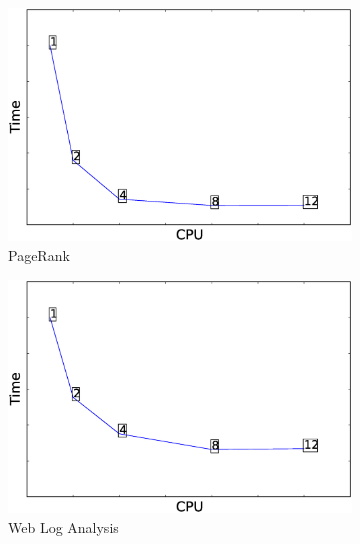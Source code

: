 \begin{figure}
    \captionsetup{justification=centering}
    \centering
    \begin{subfigure}[b]{0.3\textwidth}
        \includegraphics[width=\textwidth]{Chapter-CAT/figures/pagerank_cpu_elapsed_12_1.eps}
        \caption{PageRank}
        \label{fig:pagerank_time}
    \end{subfigure}
    \begin{subfigure}[b]{0.3\textwidth}
        \includegraphics[width=\textwidth]{Chapter-CAT/figures/webloganalysis_cpu_elapsed_12_1.eps}
        \caption{Web Log Analysis}
        \label{fig:webloganalysis_time}
    \end{subfigure}
    \begin{subfigure}[b]{0.3\textwidth}

\end{subfigure}
\end{figure}
